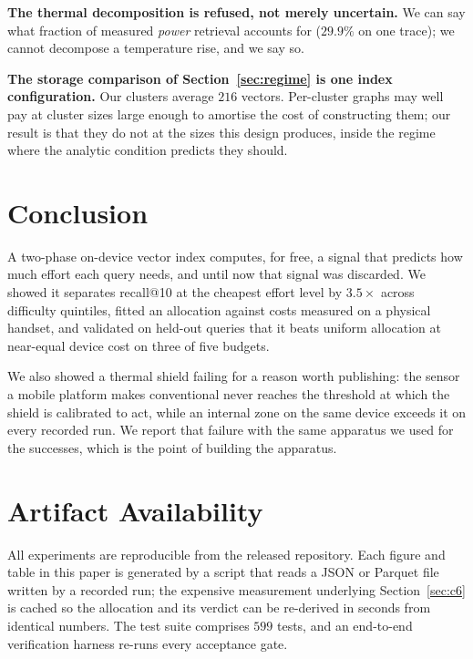 \documentclass[conference]{IEEEtran}
\begin{document}
\textbf{The thermal decomposition is refused, not merely uncertain.} We can say
what fraction of measured \emph{power} retrieval accounts for
($29.9\%$ on one trace); we cannot decompose a temperature rise, and we say so.

\textbf{The storage comparison of Section~\ref{sec:regime} is one index
configuration.} Our clusters average $216$ vectors. Per-cluster graphs may well
pay at cluster sizes large enough to amortise the cost of constructing them; our
result is that they do not at the sizes this design produces, inside the regime
where the analytic condition predicts they should.

\section{Conclusion}

A two-phase on-device vector index computes, for free, a signal that predicts
how much effort each query needs, and until now that signal was discarded. We
showed it separates recall@10 at the cheapest effort level by $3.5\times$
across difficulty quintiles, fitted an allocation against costs measured on a
physical handset, and validated on held-out queries that it beats uniform
allocation at near-equal device cost on three of five budgets.

We also showed a thermal shield failing for a reason worth publishing: the
sensor a mobile platform makes conventional never reaches the threshold at
which the shield is calibrated to act, while an internal zone on the same
device exceeds it on every recorded run. We report that failure with the same
apparatus we used for the successes, which is the point of building the
apparatus.

\section*{Artifact Availability}

All experiments are reproducible from the released repository. Each figure and
table in this paper is generated by a script that reads a JSON or Parquet file
written by a recorded run; the expensive measurement underlying
Section~\ref{sec:c6} is cached so the allocation and its verdict can be
re-derived in seconds from identical numbers. The test suite comprises $599$
tests, and an end-to-end verification harness re-runs every acceptance gate.
\end{document}
